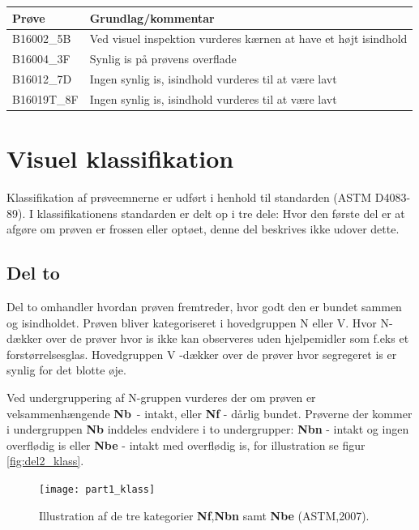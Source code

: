 %
\begin{table}
\centering
{}
\label{tab:valg_prover}
\begin{tabular}{ll}
\textbf{Prøve} & \textbf{Grundlag/kommentar} \\
\toprule
 B16002\_5B & Ved visuel inspektion vurderes kærnen at have et højt isindhold  \\
 B16004\_3F & Synlig is på prøvens overflade \\
 B16012\_7D & Ingen synlig is, isindhold vurderes til at være lavt \\
 B16019T\_8F & Ingen synlig is, isindhold vurderes til at være lavt \\
\bottomrule
\end{tabular}
\end{table}

\section{Visuel klassifikation}
Klassifikation af prøveemnerne er udført i henhold til standarden (ASTM D4083-89). I klassifikationens standarden er delt op i tre dele: 
Hvor den første del er at afgøre om prøven er frossen eller optøet, denne del beskrives ikke udover dette.

\subsection{Del to} 

Del to omhandler hvordan prøven fremtreder, hvor godt den er bundet sammen og isindholdet. Prøven bliver kategoriseret i hovedgruppen N eller V. Hvor N- dækker over de prøver hvor is ikke kan observeres uden hjelpemidler som f.eks et forstørrelsesglas. Hovedgruppen V -dækker over de prøver hvor segregeret is er synlig for det blotte øje. 


\noindent Ved undergruppering af N-gruppen vurderes der om prøven er velsammenhængende \textbf{Nb}~- intakt, eller \textbf{Nf} - dårlig bundet. Prøverne der kommer i undergruppen \textbf{Nb} inddeles endvidere i to undergrupper: \textbf{Nbn} - intakt og ingen overflødig is eller \textbf{Nbe} -  intakt med overflødig is, for illustration se figur \vref{fig:del2_klass}.

%
\begin{figure}
\centering
\texttt{[image: part1\_klass]}
\caption{Illustration af de tre kategorier \textbf{Nf},\textbf{Nbn} samt \textbf{Nbe} (ASTM,2007).}
\label{fig:del2_klass}
\end{figure}
%

